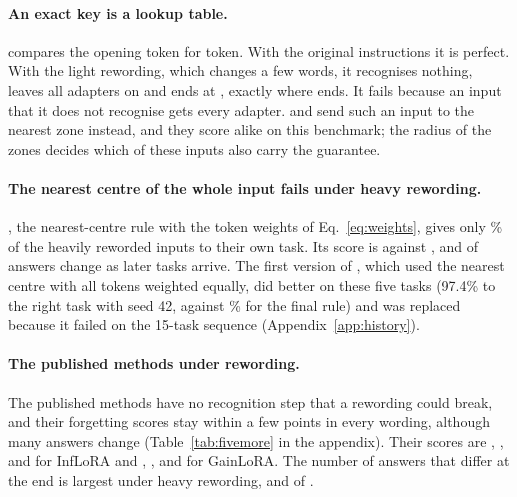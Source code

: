 \paragraph{An exact key is a lookup table.} \keyswitch{} compares the opening token for token. With the original instructions
it is perfect. With the light rewording, which changes a few words, it recognises nothing, leaves
all adapters on and ends at \FiveKeyAPLight{}, exactly where \plain{} ends. It fails because an
input that it does not recognise gets every adapter. \nearest{} and \cert{} send such an input to
the nearest zone instead, and they score alike on this benchmark; the radius of the zones decides
which of these inputs also carry the guarantee.

\paragraph{The nearest centre of the whole input fails under heavy rewording.} \centre{}, the nearest-centre rule with the token weights of Eq.~\eqref{eq:weights}, gives only
\FiveCentreRightHeavy{}\% of the heavily reworded inputs to their own task. Its score is
\FiveCentreAPHeavy{} against \FiveCertAPHeavy{}, and \FiveCentreChangedHeavy{} of
\FiveCentreComparedHeavy{} answers change as later tasks arrive. The first version of \cert{}, which used the nearest centre
with all tokens weighted equally, did better on these five tasks (97.4\% to the right task with seed 42, against
\FiveCertRightHeavy{}\% for the final rule) and was replaced because it failed on the 15-task sequence (Appendix~\ref{app:history}).

\paragraph{The published methods under rewording.} The published methods have no recognition step that a rewording could break, and
their forgetting scores stay within a few points in every wording, although many answers change (Table~\ref{tab:fivemore} in the
appendix). Their scores are \FiveInfAP{}, \FiveInfAPLight{}, \FiveInfAPMedium{} and
\FiveInfAPHeavy{} for InfLoRA and \FiveGainAP{}, \FiveGainAPLight{}, \FiveGainAPMedium{} and
\FiveGainAPHeavy{} for GainLoRA. The number of answers that differ at the end is largest under
heavy rewording, \FiveInfChangedHeavy{} and \FiveGainChangedHeavy{} of \FiveInfComparedHeavy{}.

